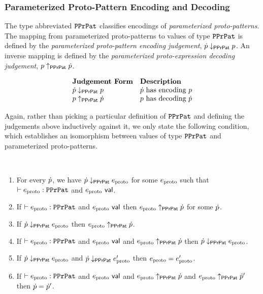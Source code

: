 \subsubsection{Parameterized Proto-Pattern Encoding and Decoding}
The type abbreviated $\mathtt{PPrPat}$ classifies encodings of \emph{parameterized proto-patterns}. The mapping from parameterized proto-patterns to values of type $\mathtt{PPrPat}$ is defined by the \emph{parameterized proto-pattern encoding judgement}, $\dot{p} \downarrow_\mathsf{PPrPat} p$. An inverse mapping is defined by the \emph{parameterized proto-expression decoding judgement}, $p \uparrow_\mathsf{PPrPat} \dot{p}$.

\[\begin{array}{ll}
\textbf{Judgement Form} & \textbf{Description}\\
\dot{p} \downarrow_\mathsf{PPrPat} p & \text{$\dot{p}$ has encoding $p$}\\
p \uparrow_\mathsf{PPrPat} \dot{p} & \text{$p$ has decoding $\dot{p}$}
\end{array}\]

Again, rather than picking a particular definition of $\mathtt{PPrPat}$ and defining the judgements above inductively against it, we only state the following condition, which establishes an isomorphism between values of type $\mathtt{PPrPat}$ and parameterized proto-patterns.

\begin{condition}\label{condition:proto-pattern-isomorphism-P} ~
\begin{enumerate}
\item For every $\dot{p}$, we have $\dot{p} \downarrow_\mathsf{PPrPat} e_\text{proto}$ for some $e_\text{proto}$ such that $\vdash e_\text{proto} : \mathtt{PPrPat}$ and $e_\text{proto}~\mathsf{val}$.
\item If $\vdash e_\text{proto} : \mathtt{PPrPat}$ and $e_\text{proto}~\mathsf{val}$ then $e_\text{proto} \uparrow_\mathsf{PPrPat} \dot{p}$ for some $\dot{p}$.
\item If $\dot{p} \downarrow_\mathsf{PPrPat} e_\text{proto}$ then $e_\text{proto} \uparrow_\mathsf{PPrPat} \dot{p}$.
\item If $\vdash e_\text{proto} : \mathtt{PPrPat}$ and $e_\text{proto}~\mathsf{val}$ and $e_\text{proto} \uparrow_\mathsf{PPrPat} \dot{p}$ then $\dot{p} \downarrow_\mathsf{PPrPat} e_\text{proto}$.
\item If $\dot{p} \downarrow_\mathsf{PPrPat} e_\text{proto}$ and $\dot{p} \downarrow_\mathsf{PPrPat} e_\text{proto}'$ then $e_\text{proto}=e_\text{proto}'$.
\item If $\vdash e_\text{proto} : \mathtt{PPrPat}$ and $e_\text{proto}~\mathsf{val}$ and $e_\text{proto} \uparrow_\mathsf{PPrPat} \dot{p}$ and $e_\text{proto} \uparrow_\mathsf{PPrPat} \dot{p}'$ then $\dot{p}=\dot{p}'$.
\end{enumerate}
\end{condition}

